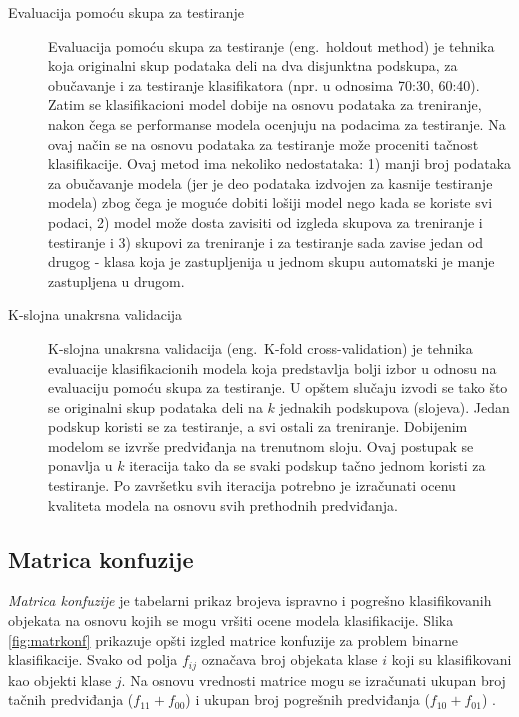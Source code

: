 \documentclass[12pt,oneside]{memoir}
\begin{document}
\begin{description}

\item[Evaluacija pomoću skupa za testiranje] Evaluacija pomoću skupa za testiranje (eng.~holdout method) je tehnika koja originalni skup podataka deli na dva disjunktna podskupa, za obučavanje i za testiranje klasifikatora (npr. u odnosima 70:30, 60:40). Zatim se klasifikacioni model dobije na osnovu podataka za treniranje, nakon čega se performanse modela ocenjuju na podacima za testiranje. Na ovaj način se na osnovu podataka za testiranje može proceniti tačnost klasifikacije. Ovaj metod ima nekoliko nedostataka: 1) manji broj podataka za obučavanje modela (jer je deo podataka izdvojen za kasnije testiranje modela) zbog čega je moguće dobiti lošiji model nego kada se koriste svi podaci, 2) model može dosta zavisiti od izgleda skupova za treniranje i testiranje i 3) skupovi za treniranje i za testiranje sada zavise jedan od drugog - klasa koja je zastupljenija u jednom skupu automatski je manje zastupljena u drugom.

\item[K-slojna unakrsna validacija] K-slojna unakrsna validacija (eng.~K-fold cross-validation) je tehnika evaluacije klasifikacionih modela koja predstavlja bolji izbor u odnosu na evaluaciju pomoću skupa za testiranje. U opštem slučaju izvodi se tako što se originalni skup podataka deli na $k$ jednakih podskupova (slojeva). Jedan podskup koristi se za testiranje, a svi ostali za treniranje. Dobijenim modelom se izvrše predviđanja na trenutnom sloju. Ovaj postupak se ponavlja u $k$ iteracija tako da se svaki podskup tačno jednom koristi za testiranje. Po završetku svih iteracija potrebno je izračunati ocenu kvaliteta modela na osnovu svih prethodnih predviđanja. 
\end{description}

\subsection{Matrica konfuzije}

\textit{Matrica konfuzije} je tabelarni prikaz brojeva ispravno i pogrešno klasifikovanih objekata na osnovu kojih se mogu vršiti ocene modela klasifikacije. Slika \ref{fig:matrkonf} prikazuje opšti izgled matrice konfuzije za problem binarne klasifikacije. Svako od polja $f_{ij}$ označava broj objekata klase $i$ koji su klasifikovani kao objekti klase $j$. Na osnovu vrednosti matrice mogu se izračunati ukupan broj tačnih predviđanja ($f_{11}+f_{00}$) i ukupan broj pogrešnih predviđanja ($f_{10}+f_{01}$) \cite{mitic}.
\end{document}
